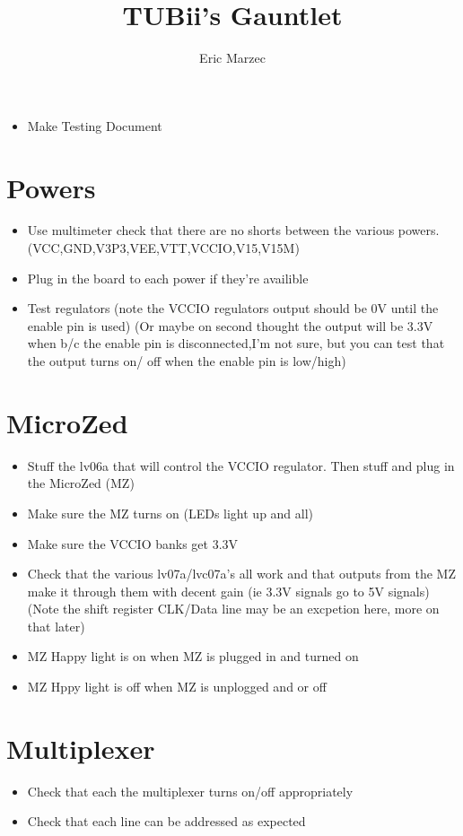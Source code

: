 \documentclass[11pt,a4paper]{article}
\title{TUBii's Gauntlet}
\author{Eric Marzec}
\begin{document}
\maketitle
\begin{abstract}

\end{abstract}
\begin{itemize}
\item Make Testing Document
\end{itemize}
\section{Powers}
\begin{itemize}
\item Use multimeter check that there are no shorts between the various powers.
(VCC,GND,V3P3,VEE,VTT,VCCIO,V15,V15M)
\item Plug in the board to each power if they're availible
\item Test regulators (note the VCCIO regulators output should be 0V until the 
enable pin is used) (Or maybe on second thought the output will be 3.3V when b/c the
enable pin is disconnected,I'm not sure, but you can test that the output turns on/ off when the enable pin is low/high)
\end{itemize}
\section{MicroZed}
\begin{itemize}
\item Stuff the lv06a that will control the VCCIO regulator. Then stuff and plug in the MicroZed (MZ)
\item Make sure the MZ turns on (LEDs light up and all)
\item Make sure the VCCIO banks get 3.3V
\item Check that the various lv07a/lvc07a's all work and that outputs from the MZ
make it through them with decent gain (ie 3.3V signals go to 5V signals)(Note the shift register CLK/Data line may be an excpetion here, more on that later)
\item MZ Happy light is on when MZ is plugged in and turned on
\item MZ Hppy light is off when MZ is unplogged and or off
\end{itemize}
\section{Multiplexer}
\begin{itemize}
\item Check that each the multiplexer turns on/off appropriately
\item Check that each line can be addressed as expected
\end{itemize}
\end{document}
